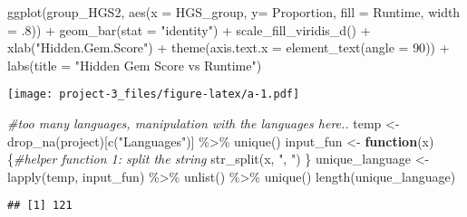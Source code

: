 \documentclass[
]{article}
\newenvironment{Shaded}{\begin{snugshade}}{\end{snugshade}}
\newcommand{\AttributeTok}[1]{\textcolor[rgb]{0.77,0.63,0.00}{#1}}
\newcommand{\CommentTok}[1]{\textcolor[rgb]{0.56,0.35,0.01}{\textit{#1}}}
\newcommand{\ControlFlowTok}[1]{\textcolor[rgb]{0.13,0.29,0.53}{\textbf{#1}}}
\newcommand{\DecValTok}[1]{\textcolor[rgb]{0.00,0.00,0.81}{#1}}
\newcommand{\FunctionTok}[1]{\textcolor[rgb]{0.00,0.00,0.00}{#1}}
\newcommand{\NormalTok}[1]{#1}
\newcommand{\OtherTok}[1]{\textcolor[rgb]{0.56,0.35,0.01}{#1}}
\newcommand{\SpecialCharTok}[1]{\textcolor[rgb]{0.00,0.00,0.00}{#1}}
\newcommand{\StringTok}[1]{\textcolor[rgb]{0.31,0.60,0.02}{#1}}
\begin{document}
\begin{Shaded}
\begin{Highlighting}[]
  
\FunctionTok{ggplot}\NormalTok{(group\_HGS2, }\FunctionTok{aes}\NormalTok{(}\AttributeTok{x =}\NormalTok{ HGS\_group, }\AttributeTok{y=}\NormalTok{ Proportion, }\AttributeTok{fill =}\NormalTok{ Runtime, }\AttributeTok{width =}\NormalTok{ .}\DecValTok{8}\NormalTok{)) }\SpecialCharTok{+} 
  \FunctionTok{geom\_bar}\NormalTok{(}\AttributeTok{stat =} \StringTok{"identity"}\NormalTok{) }\SpecialCharTok{+}
  \FunctionTok{scale\_fill\_viridis\_d}\NormalTok{() }\SpecialCharTok{+} \FunctionTok{xlab}\NormalTok{(}\StringTok{"Hidden.Gem.Score"}\NormalTok{)  }\SpecialCharTok{+}
  \FunctionTok{theme}\NormalTok{(}\AttributeTok{axis.text.x =} \FunctionTok{element\_text}\NormalTok{(}\AttributeTok{angle =} \DecValTok{90}\NormalTok{)) }\SpecialCharTok{+} \FunctionTok{labs}\NormalTok{(}\AttributeTok{title =} \StringTok{"Hidden Gem Score vs Runtime"}\NormalTok{)}
\end{Highlighting}
\end{Shaded}

\texttt{[image: project-3\_files/figure-latex/a-1.pdf]}

\begin{Shaded}
\begin{Highlighting}[]
\CommentTok{\#too many languages, manipulation with the languages here..}
\NormalTok{temp }\OtherTok{\textless{}{-}} \FunctionTok{drop\_na}\NormalTok{(project)[}\FunctionTok{c}\NormalTok{(}\StringTok{"Languages"}\NormalTok{)] }\SpecialCharTok{\%\textgreater{}\%} \FunctionTok{unique}\NormalTok{()}
\NormalTok{input\_fun }\OtherTok{\textless{}{-}}
  \ControlFlowTok{function}\NormalTok{(x) \{}\CommentTok{\#helper function 1: split the string}
    \FunctionTok{str\_split}\NormalTok{(x, }\StringTok{", "}\NormalTok{)}
\NormalTok{  \}}
\NormalTok{unique\_language }\OtherTok{\textless{}{-}}
  \FunctionTok{lapply}\NormalTok{(temp, input\_fun) }\SpecialCharTok{\%\textgreater{}\%} \FunctionTok{unlist}\NormalTok{() }\SpecialCharTok{\%\textgreater{}\%} \FunctionTok{unique}\NormalTok{()   }
\FunctionTok{length}\NormalTok{(unique\_language)}
\end{Highlighting}
\end{Shaded}

\begin{verbatim}
## [1] 121
\end{verbatim}
\end{document}
